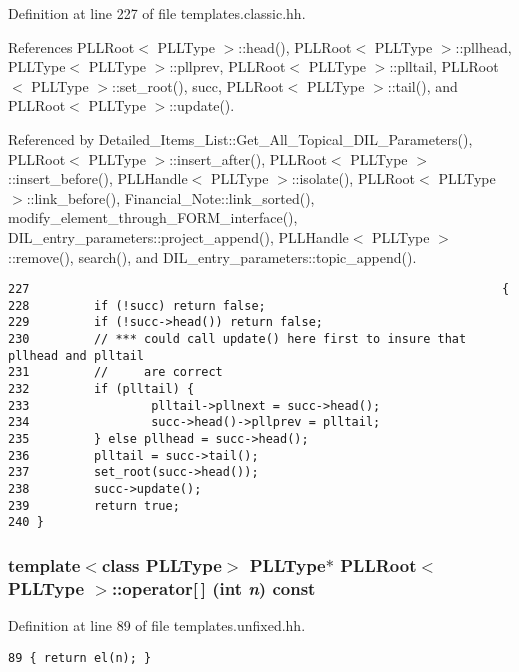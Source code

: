 Definition at line 227 of file templates.classic.hh.

References PLLRoot$<$ PLLType $>$::head(), PLLRoot$<$ PLLType $>$::pllhead, PLLType$<$ PLLType $>$::pllprev, PLLRoot$<$ PLLType $>$::plltail, PLLRoot$<$ PLLType $>$::set\_\-root(), succ, PLLRoot$<$ PLLType $>$::tail(), and PLLRoot$<$ PLLType $>$::update().

Referenced by Detailed\_\-Items\_\-List::Get\_\-All\_\-Topical\_\-DIL\_\-Parameters(), PLLRoot$<$ PLLType $>$::insert\_\-after(), PLLRoot$<$ PLLType $>$::insert\_\-before(), PLLHandle$<$ PLLType $>$::isolate(), PLLRoot$<$ PLLType $>$::link\_\-before(), Financial\_\-Note::link\_\-sorted(), modify\_\-element\_\-through\_\-FORM\_\-interface(), DIL\_\-entry\_\-parameters::project\_\-append(), PLLHandle$<$ PLLType $>$::remove(), search(), and DIL\_\-entry\_\-parameters::topic\_\-append().



\footnotesize\begin{verbatim}227                                                                  { 
228         if (!succ) return false; 
229         if (!succ->head()) return false; 
230         // *** could call update() here first to insure that pllhead and plltail
231         //     are correct
232         if (plltail) { 
233                 plltail->pllnext = succ->head(); 
234                 succ->head()->pllprev = plltail; 
235         } else pllhead = succ->head(); 
236         plltail = succ->tail(); 
237         set_root(succ->head()); 
238         succ->update(); 
239         return true; 
240 } 
\end{verbatim}\normalsize 
{}
\subsubsection{\setlength{\rightskip}{0pt plus 5cm}template$<$class PLLType$>$ {\bf PLLType}$\ast$ PLLRoot$<$ {\bf PLLType} $>$::operator[$\,$] (int {\em n}) const\hspace{0.3cm}{\tt  [inline]}}\label{classPLLRoot_a56}




Definition at line 89 of file templates.unfixed.hh.



\footnotesize\begin{verbatim}89 { return el(n); } 
\end{verbatim}\normalsize 
{}
